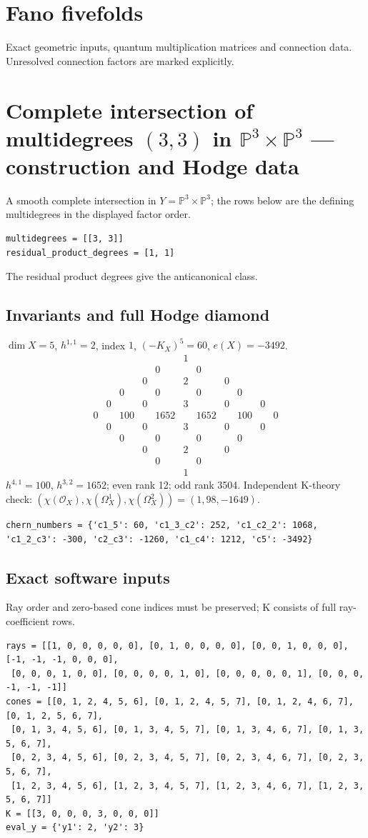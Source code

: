 \documentclass[10pt,a4paper]{article}
\begin{document}
\section*{Fano fivefolds}
Exact geometric inputs, quantum multiplication matrices and connection data. Unresolved connection factors are marked explicitly.
\clearpage\section*{Complete intersection of multidegrees $(3,3)$ in $\mathbb P^{3}\times \mathbb P^{3}$ --- construction and Hodge data}\label{entry:PROD5-B03}
A smooth complete intersection in $Y=\mathbb P^{3}\times\mathbb P^{3}$; the rows below are the defining multidegrees in the displayed factor order.
\begin{lstlisting}
multidegrees = [[3, 3]]
residual_product_degrees = [1, 1]
\end{lstlisting}
The residual product degrees give the anticanonical class.
\subsection*{Invariants and full Hodge diamond}
$\dim X=5$, $h^{1,1}=2$, index $1$, $(-K_X)^5=60$, $e(X)=-3492$.
\[\begin{array}{ccccccccccc}&&&&&1&&&&&\\&&&&0&&0&&&&\\&&&0&&2&&0&&&\\&&0&&0&&0&&0&&\\&0&&0&&3&&0&&0&\\0&&100&&1652&&1652&&100&&0\\&0&&0&&3&&0&&0&\\&&0&&0&&0&&0&&\\&&&0&&2&&0&&&\\&&&&0&&0&&&&\\&&&&&1&&&&&\end{array}\]
$h^{4,1}=100$, $h^{3,2}=1652$; even rank 12; odd rank 3504.
Independent K-theory check: $(\chi(\mathcal O_X),\chi(\Omega_X^1),\chi(\Omega_X^2))=(1, 98, -1649)$.
\begin{lstlisting}
chern_numbers = {'c1_5': 60, 'c1_3_c2': 252, 'c1_c2_2': 1068, 'c1_2_c3': -300, 'c2_c3': -1260, 'c1_c4': 1212, 'c5': -3492}
\end{lstlisting}
\subsection*{Exact software inputs}
Ray order and zero-based cone indices must be preserved; K consists of full ray-coefficient rows.
\begin{lstlisting}
rays = [[1, 0, 0, 0, 0, 0], [0, 1, 0, 0, 0, 0], [0, 0, 1, 0, 0, 0], [-1, -1, -1, 0, 0, 0],
 [0, 0, 0, 1, 0, 0], [0, 0, 0, 0, 1, 0], [0, 0, 0, 0, 0, 1], [0, 0, 0, -1, -1, -1]]
cones = [[0, 1, 2, 4, 5, 6], [0, 1, 2, 4, 5, 7], [0, 1, 2, 4, 6, 7], [0, 1, 2, 5, 6, 7],
 [0, 1, 3, 4, 5, 6], [0, 1, 3, 4, 5, 7], [0, 1, 3, 4, 6, 7], [0, 1, 3, 5, 6, 7],
 [0, 2, 3, 4, 5, 6], [0, 2, 3, 4, 5, 7], [0, 2, 3, 4, 6, 7], [0, 2, 3, 5, 6, 7],
 [1, 2, 3, 4, 5, 6], [1, 2, 3, 4, 5, 7], [1, 2, 3, 4, 6, 7], [1, 2, 3, 5, 6, 7]]
K = [[3, 0, 0, 0, 3, 0, 0, 0]]
eval_y = {'y1': 2, 'y2': 3}
\end{lstlisting}
\end{document}

